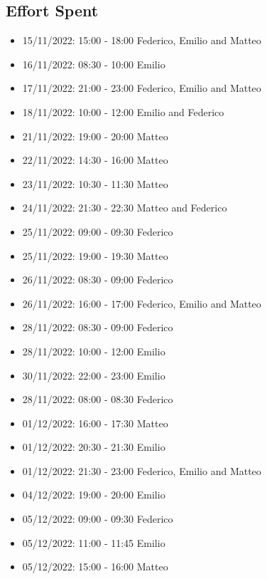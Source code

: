 \subsection{Effort Spent}
\begin{itemize}
    \item 15/11/2022: 15:00 - 18:00 Federico, Emilio and Matteo
    \item 16/11/2022: 08:30 - 10:00 Emilio
    \item 17/11/2022: 21:00 - 23:00 Federico, Emilio and Matteo
    \item 18/11/2022: 10:00 - 12:00 Emilio and Federico
    \item 21/11/2022: 19:00 - 20:00 Matteo
    \item 22/11/2022: 14:30 - 16:00 Matteo
    \item 23/11/2022: 10:30 - 11:30 Matteo
    \item 24/11/2022: 21:30 - 22:30 Matteo and Federico
    \item 25/11/2022: 09:00 - 09:30 Federico
    \item 25/11/2022: 19:00 - 19:30 Matteo
    \item 26/11/2022: 08:30 - 09:00 Federico
    \item 26/11/2022: 16:00 - 17:00 Federico, Emilio and Matteo
    \item 28/11/2022: 08:30 - 09:00 Federico
    \item 28/11/2022: 10:00 - 12:00 Emilio
    \item 30/11/2022: 22:00 - 23:00 Emilio
    \item 28/11/2022: 08:00 - 08:30 Federico
    \item 01/12/2022: 16:00 - 17:30 Matteo
    \item 01/12/2022: 20:30 - 21:30 Emilio
    \item 01/12/2022: 21:30 - 23:00 Federico, Emilio and Matteo
    \item 04/12/2022: 19:00 - 20:00 Emilio
    \item 05/12/2022: 09:00 - 09:30 Federico
    \item 05/12/2022: 11:00 - 11:45 Emilio
    \item 05/12/2022: 15:00 - 16:00 Matteo
\end{itemize}